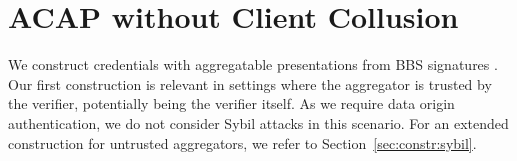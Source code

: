 \section{ACAP without Client Collusion} \label{sec:constr:acap}
We construct credentials with aggregatable presentations from BBS signatures \cite{DBLP:conf/eurocrypt/TessaroZ23a}. Our first construction is relevant in settings where the aggregator is trusted by the verifier, potentially being the verifier itself. As we require data origin authentication, we do not consider Sybil attacks in this scenario. For an extended construction for untrusted aggregators, we refer to Section~\ref{sec:constr:sybil}.



